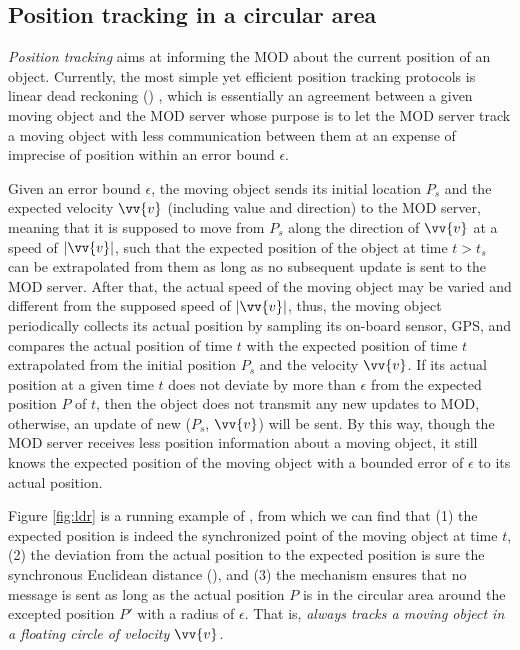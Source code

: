 \subsection{Position tracking in a circular area}

\textit{Position tracking} aims at informing the MOD about the current position of an object. Currently, the most simple yet efficient position tracking protocols is linear dead reckoning (\ldr) \cite{ Wolfson:PositionTracking}, which is essentially an agreement between a given moving object and the MOD server whose purpose is to let the MOD server track a moving object with less communication between them at an expense of imprecise of position within an error bound $\epsilon$.  

Given an error bound $\epsilon$, the moving object sends its initial location $P_s$ and the expected velocity $\vv{v}$
(including value and direction) to the MOD server, meaning that it is supposed to move from $P_s$ along the direction of $\vv{v}$ at a speed of $|\vv{v}|$, such that the expected position of the object at time $t>t_s$ can be extrapolated from them as long as no subsequent update is sent to the MOD server. 
After that, the actual speed of the moving object may be varied and different from the supposed speed of $|\vv{v}|$, thus, the moving object periodically collects its actual position by sampling its on-board sensor, \eg GPS, and compares the actual position of time $t$ with the expected position of time $t$ extrapolated from the initial position $P_s$ and the velocity $\vv{v}$. If its actual position at a given time $t$ does not deviate by more than $\epsilon$ from the expected position $P$ of $t$, then the object does not transmit any new updates to MOD, otherwise, an update of new ($P_s$, $\vv{v}$) will be sent.
%
By this way, though the MOD server receives less position information about a moving object, it still knows the expected position of the moving object with a bounded error of $\epsilon$ to its actual position.


Figure \ref{fig:ldr} is a running example of \ldr, from which we can find that (1) the expected position is indeed the synchronized point of the moving object at time $t$, (2) the deviation from the actual position to the expected position is sure the synchronous Euclidean distance (\sed), and (3) the \ldr mechanism ensures that no message is sent as long as the actual position $P$ is in the circular area around the excepted position $P'$ with a radius of $\epsilon$. That is, \emph{\ldr always tracks a moving object in a floating circle of velocity $\vv{v}$.}

